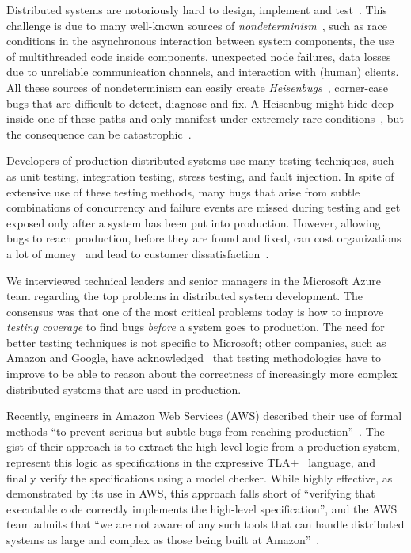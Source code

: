 Distributed systems are notoriously hard to design, implement and test~\cite{cavage2013there, laguna2015debugging, maddox2015test}. This challenge is due to many well-known sources of \emph{nondeterminism}~\cite{chandra2007paxos}, such as race conditions in the asynchronous interaction between system components, the use of multithreaded code inside components, unexpected node failures, data losses due to unreliable communication channels, and interaction with (human) clients. All these sources of nondeterminism can easily create \emph{Heisenbugs}~\cite{gray1986computers, musuvathi2008finding}, corner-case bugs that are difficult to detect, diagnose and fix. A Heisenbug might hide deep inside one of these paths and only manifest under extremely rare conditions~\cite{gray1986computers, musuvathi2008finding}, but the consequence can be catastrophic~\cite{amazon2012aws, google2014outage}.

Developers of production distributed systems use many testing techniques, such as unit testing, integration testing, stress testing, and fault injection. In spite of extensive use of these testing methods, many bugs that arise from subtle combinations of concurrency and failure events are missed during testing and get exposed only after a system has been put into production. However, allowing bugs to reach production, before they are found and fixed, can cost organizations a lot of money~\cite{tassey2002economic} and lead to customer dissatisfaction~\cite{amazon2012aws, google2014outage}.

We interviewed technical leaders and senior managers in the Microsoft Azure team regarding the top problems in distributed system development. The consensus was that one of the most critical problems today is how to improve \emph{testing coverage} to find bugs \emph{before} a system goes to production. The need for better testing techniques is not specific to Microsoft; other companies, such as Amazon and Google, have acknowledged~\cite{chandra2007paxos,newcombe2015aws} that testing methodologies have to improve to be able to reason about the correctness of increasingly more complex distributed systems that are used in production.

Recently, engineers in Amazon Web Services (AWS) described their use of formal methods ``to prevent serious but subtle bugs from reaching production''~\cite{newcombe2015aws}. The gist of their approach is to extract the high-level logic from a production system, represent this logic as specifications in the expressive TLA+~\cite{lamport1994temporal} language, and finally verify the specifications using a model checker. While highly effective, as demonstrated by its use in AWS, this approach falls short of ``verifying that executable code correctly implements the high-level specification'', and the AWS team admits that ``we are not aware of any such tools that can handle distributed systems as large and complex as those being built at Amazon''~\cite{newcombe2015aws}.

